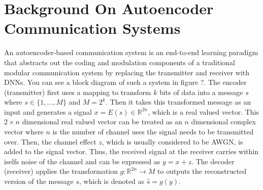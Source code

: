 \section{Background On Autoencoder Communication Systems}
\label{s:design}
An autoencoder-based communication system is an end-to-end learning paradigm that abstracts out the coding and modulation components of a  traditional modular communication system by replacing the transmitter and receiver with DNNs. You can see a block diagram of such a system in figure ?. The encoder (transmitter) first uses a mapping to transform \(k\) bits of data into a message \(s\) where \(s \in \{1,...,M\}\) and \(M = 2^k\). Then it takes this transformed message as an input and generates a signal \(x = E(s) \in \mathbb{R}^{2n}\), which is a real valued vector. This \(2 \times n\) dimensional real valued vector can be treated as an \(n\) dimensional complex vector where \(n\) is the number of channel uses the signal needs to be transmitted over. Then, the channel effect \(z\), which is usually considered to be AWGN, is added to the signal vector. Thus, the received signal at the receiver carries within iselfs noise of the channel and can be expressed as \(y = x + z\). The decoder (receiver) applies the transformation \(g: \mathbb{R}^{2n} \rightarrow M \) to outputs the reconstructed version of the message \(s\), which is denoted as \(\hat{s} = g(y)\).